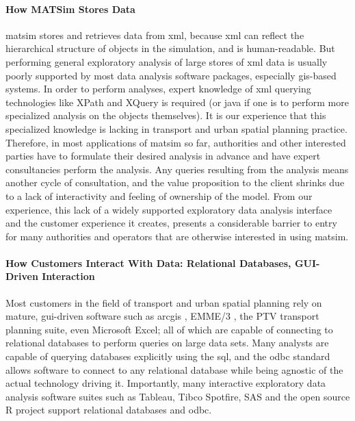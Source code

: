 \paragraph{How MATSim Stores Data}
\gls{matsim} stores and retrieves data from \gls{xml}, because \gls{xml} can reflect the hierarchical structure of objects in the simulation, and is human-readable. But performing general exploratory analysis of large stores of \gls{xml} data is usually poorly supported by most data analysis software packages, especially \gls{gis}-based systems. In order to perform analyses, expert knowledge of \gls{xml} querying technologies like XPath and XQuery is required (or \gls{java} if one is to perform more specialized analysis on the objects themselves). It is our experience that this specialized knowledge is lacking in transport and urban spatial planning practice. Therefore, in most applications of \gls{matsim} so far, authorities and other interested parties have to formulate their desired analysis in advance and have expert consultancies perform the analysis. Any queries resulting from the analysis means another cycle of consultation, and the value proposition to the client shrinks due to a lack of interactivity and feeling of ownership of the model. From our experience, this lack of a widely supported exploratory data analysis interface and the customer experience it creates, presents a considerable barrier to entry for many authorities and operators that are otherwise interested in using \gls{matsim}.

\paragraph{How Customers Interact With Data: Relational Databases, GUI-Driven Interaction}
Most customers in the field of transport and urban spatial planning rely on mature, \gls{gui}-driven software such as \gls{arcgis} \citep{ARC_GIS_2011}, EMME/3 \citep{EMME_Webpage_2015}, the PTV \citep{PTV_Webpage_2009} transport planning suite, even Microsoft Excel; all of which are capable of connecting to relational databases to perform queries on large data sets. Many analysts are capable of querying databases explicitly using the \gls{sql}, and the \gls{odbc} standard allows software to connect to any relational database while being agnostic of the actual technology driving it. Importantly, many interactive exploratory data analysis software suites such as Tableau, Tibco Spotfire, SAS and the open source R project support relational databases and \gls{odbc}.

